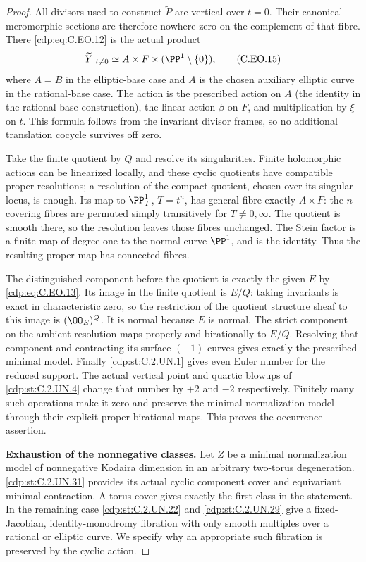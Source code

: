 \begin{proof}
All divisors used to construct
$\widetilde P$ are vertical over
$t=0$. Their canonical meromorphic
sections are therefore nowhere
zero on the complement of that
fibre. There \eqref{cdp:eq:C.EO.12} is the
actual product
\[
 \widetilde Y|_{t\ne0}
       \simeq A\times F\times(\PP^1\setminus\{0\}),
                                                               \tag{C.EO.15}\label{cdp:eq:C.EO.15}
\]
where $A=B$ in the elliptic-base
case and $A$ is the chosen auxiliary
elliptic curve in the rational-base
case. The action is the prescribed
action on $A$ (the identity in the
rational-base construction),
the linear action $\beta$ on $F$,
and multiplication by $\xi$ on
$t$. This formula follows from
the invariant divisor frames,
so no additional translation
cocycle survives off zero.

Take the finite quotient by $Q$
and resolve its singularities.
Finite holomorphic actions can
be linearized locally, and these
cyclic quotients have compatible
proper resolutions; a resolution
of the compact quotient, chosen
over its singular locus, is
enough. Its map to
$\PP^1_T$, $T=t^n$, has general
fibre exactly $A\times F$:
the $n$ covering fibres are
permuted simply transitively
for $T\ne0,\infty$. The quotient
is smooth there, so the
resolution leaves those fibres
unchanged. The Stein factor is
a finite map of degree one
to the normal curve $\PP^1$,
and is the identity. Thus
the resulting proper map has
connected fibres.

The distinguished component
before the quotient is exactly
the given $E$ by \eqref{cdp:eq:C.EO.13}.
Its image in the finite quotient
is $E/Q$: taking invariants
is exact in characteristic zero,
so the restriction of the
quotient structure sheaf to
this image is
$(\OO_E)^Q$. It is normal
because $E$ is normal. The
strict component on the ambient
resolution maps properly and
birationally to $E/Q$.
Resolving that component and
contracting its surface
$(-1)$-curves gives exactly
the prescribed minimal model.
Finally \ref{cdp:st:C.2.UN.1} gives even Euler
number for the reduced support.
The actual vertical point and
quartic blowups of \ref{cdp:st:C.2.UN.4} change
that number by $+2$ and $-2$
respectively. Finitely many
such operations make it zero
and preserve the minimal
normalization model through
their explicit proper
birational maps. This proves
the occurrence assertion.

\par\medskip\noindent\textbf{Exhaustion of the nonnegative classes.}
Let $Z$ be a minimal normalization
model of nonnegative Kodaira
dimension in an arbitrary
two-torus degeneration. \ref{cdp:st:C.2.UN.31}
provides its actual cyclic
component cover and equivariant
minimal contraction. A torus
cover gives exactly the first
class in the statement. In
the remaining case \ref{cdp:st:C.2.UN.22} and
\ref{cdp:st:C.2.UN.29} give a fixed-Jacobian,
identity-monodromy fibration
with only smooth multiples
over a rational or elliptic
curve. We specify why an
appropriate such fibration
is preserved by the cyclic
action.


\end{proof}
